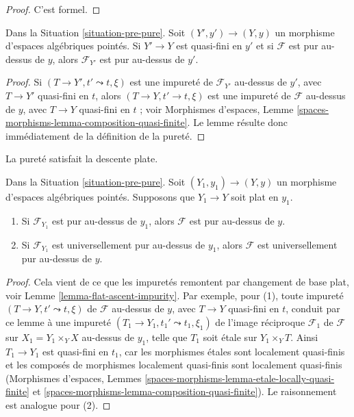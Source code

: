 \begin{proof}
C'est formel.
\end{proof}

\begin{lemma}
\label{lemma-quasi-finite-base-change}
Dans la Situation \ref{situation-pre-pure}.
Soit $(Y', y') \to (Y, y)$ un morphisme d'espaces algébriques pointés.
Si $Y' \to Y$ est quasi-fini en $y'$ et si $\mathcal{F}$ est pur au-dessus de $y$,
alors $\mathcal{F}_{Y'}$ est pur au-dessus de $y'$.
\end{lemma}

\begin{proof}
Si $(T \to Y', t' \leadsto t, \xi)$ est une impureté de
$\mathcal{F}_{Y'}$ au-dessus de $y'$, avec $T \to Y'$ quasi-fini en $t$,
alors $(T \to Y, t' \to t, \xi)$ est une impureté de $\mathcal{F}$
au-dessus de $y$, avec $T \to Y$ quasi-fini en $t$ ; voir
Morphismes d'espaces, Lemme
\ref{spaces-morphisms-lemma-composition-quasi-finite}.
Le lemme résulte donc immédiatement de la définition de la pureté.
\end{proof}

\noindent
La pureté satisfait la descente plate.

\begin{lemma}
\label{lemma-flat-descend-pure}
Dans la Situation \ref{situation-pre-pure}.
Soit $(Y_1, y_1) \to (Y, y)$ un morphisme d'espaces algébriques pointés.
Supposons que $Y_1 \to Y$ soit plat en $y_1$.
\begin{enumerate}
\item Si $\mathcal{F}_{Y_1}$ est pur au-dessus de $y_1$,
alors $\mathcal{F}$ est pur au-dessus de $y$.
\item Si $\mathcal{F}_{Y_1}$ est universellement pur au-dessus de $y_1$,
alors $\mathcal{F}$ est universellement pur au-dessus de $y$.
\end{enumerate}
\end{lemma}

\begin{proof}
Cela vient de ce que les impuretés remontent par changement de base plat, voir
Lemme \ref{lemma-flat-ascent-impurity}. Par exemple,
pour (1), toute impureté $(T \to Y, t' \leadsto t, \xi)$
de $\mathcal{F}$ au-dessus de $y$, avec $T \to Y$ quasi-fini en $t$,
conduit par ce lemme à une impureté
$(T_1 \to Y_1, t_1' \leadsto t_1, \xi_1)$ de l'image réciproque
$\mathcal{F}_1$ de $\mathcal{F}$ sur $X_1 = Y_1 \times_Y X$
au-dessus de $y_1$, telle que $T_1$ soit \'etale sur $Y_1 \times_Y T$.
Ainsi $T_1 \to Y_1$ est quasi-fini en $t_1$, car
les morphismes \'etales sont localement quasi-finis et les composés
de morphismes localement quasi-finis sont localement quasi-finis
(Morphismes d'espaces, Lemmes
\ref{spaces-morphisms-lemma-etale-locally-quasi-finite} et
\ref{spaces-morphisms-lemma-composition-quasi-finite}).
Le raisonnement est analogue pour (2).
\end{proof}

